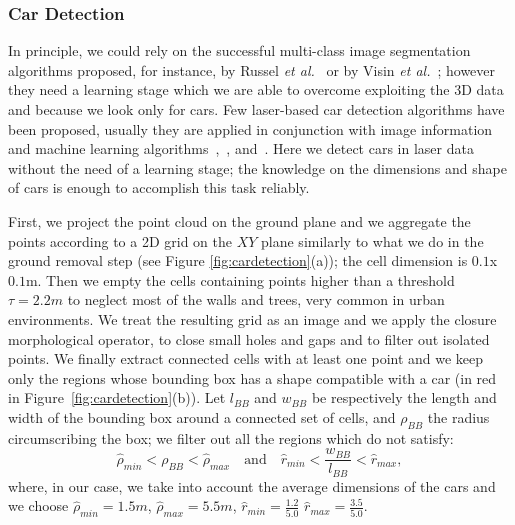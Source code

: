 \subsubsection{Car Detection}
In principle, we could rely on the successful multi-class image segmentation algorithms proposed, for instance, by Russel \emph{et al.}~\cite{russell2009associative} or by Visin \emph{et al.}~\cite{visin2016reseg}; however they need a learning stage which we are able to overcome exploiting the 3D data and because we look only for cars.
Few laser-based car detection algorithms have been proposed, usually they are applied in conjunction with image information and machine learning algorithms~\cite{wender20083d},~\cite{zhang2014vehicle}, and~\cite{premebida2007lidar}.
Here we detect cars in laser data without the need of a learning stage; the knowledge on the dimensions and shape of cars is enough to accomplish this task reliably.

First, we project the point cloud on the ground plane and we aggregate the points according to a 2D grid on the $XY$ plane similarly to what we do in the ground removal step (see Figure \ref{fig:cardetection}(a)); the cell dimension is $0.1$x$0.1$m.
Then we empty the cells containing points higher than a threshold $\tau=2.2m$ to neglect most of the walls and trees, very common in urban environments.
We treat the resulting grid as an image and we apply the closure morphological operator, to close small holes and gaps and to filter out isolated points.
We finally extract connected cells with at least one point and we keep only the regions whose bounding box has a shape compatible with a car (in red in Figure~\ref{fig:cardetection}(b)). 
Let $l_{BB}$ and $w_{BB}$ be respectively the length and width of the bounding box around a connected set of cells, and $\rho_{BB}$ the radius circumscribing the box; we filter out all the regions which do not satisfy:
\begin{equation}
 \hat{\rho}_{min} < \rho_{BB} < \hat{\rho}_{max} \quad \text{and} \quad  \hat{r}_{min} < \frac{w_{BB}}{l_{BB}}< \hat{r}_{max},
\end{equation}
where, in our case, we take into account the average dimensions of the cars and we choose $\hat{\rho}_{min} = 1.5m$, $\hat{\rho}_{max}=5.5m$,  $\hat{r}_{min} =\frac{1.2}{5.0}$ $\hat{r}_{max} = \frac{3.5}{5.0}$.


